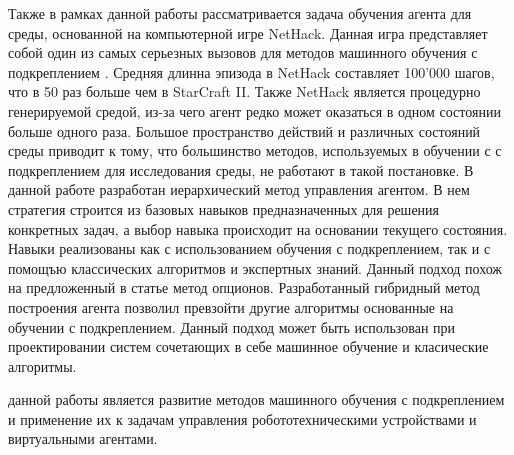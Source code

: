 Также в рамках данной работы рассматривается задача обучения агента для среды, основанной на компьютерной игре NetHack. Данная игра представляет собой один из самых серьезных вызовов для методов машинного обучения с подкреплением \cite{nethack}. Средняя длинна эпизода в NetHack составляет 100'000 шагов, что в 50 раз больше чем в StarCraft II. Также NetHack является процедурно генерируемой средой, из-за чего агент редко может оказаться в одном состоянии больше одного раза. Большое пространство действий и различных состояний среды приводит к тому, что большинство методов, используемых в обучении с с подкреплением для исследования среды, не работают в такой постановке. В данной работе разработан иерархический метод управления агентом. В нем стратегия строится из базовых навыков предназначенных для решения конкретных задач, а выбор навыка происходит на основании текущего состояния. Навыки реализованы как с использованием обучения с подкреплением, так и с помощъю классических алгоритмов и экспертных знаний. Данный подход похож на предложенный в статье \cite{Sutton1999} метод опционов. Разработанный гибридный метод построения агента позволил превзойти другие алгоритмы основанные на обучении с подкреплением. Данный подход может быть использован при проектировании систем сочетающих в себе машинное обучение и класические алгоритмы. 



{\aim} данной работы является развитие методов машинного обучения с подкреплением и применение их к задачам управления робототехническими устройствами и виртуальными агентами. 

